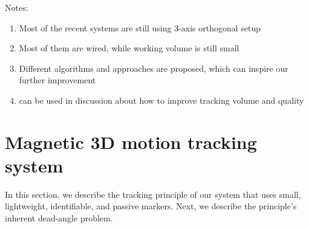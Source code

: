 \documentclass[journal,twoside,web]{ieeecolor}
\begin{document}
Notes:
\begin{enumerate}
\item Most of the recent systems are still using 3-axis orthogonal setup
\item Most of them are wired, while working volume is still small
\item Different algorithms and approaches are proposed, which can inspire our further improvement
\item \cite{Transmitter Optimization} can be used in discussion about how to improve tracking volume and quality
\end{enumerate}

\section{Magnetic 3D motion tracking system}
\label{overview}
In this section, we describe the tracking principle of our system that uses small, lightweight, identifiable, and passive markers. Next, we describe the principle’s inherent dead-angle problem.
\end{document}
